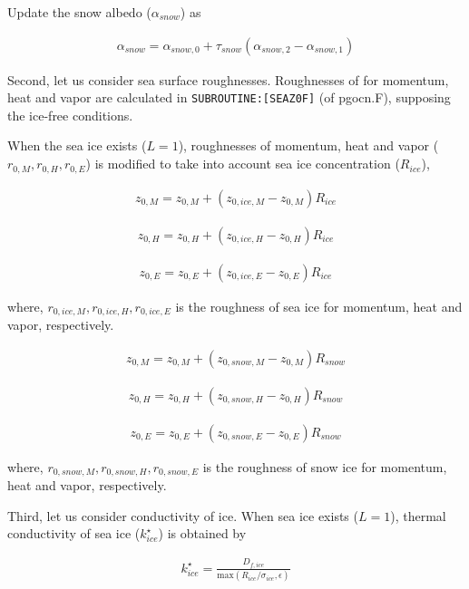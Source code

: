 Update the snow albedo (\(\alpha_{snow}\)) as

\begin{eqnarray}
    \alpha_{snow} = \alpha_{snow,0} + \tau_{snow}(\alpha_{snow,2}-\alpha_{snow,1})
\end{eqnarray}

Second, let us consider sea surface roughnesses. Roughnesses of for
momentum, heat and vapor are calculated in
\texttt{SUBROUTINE:{[}SEAZ0F{]}} (of pgocn.F), supposing the ice-free
conditions.

When the sea ice exists (\(L=1\)), roughnesses of momentum, heat and
vapor (\(r_{0,M},r_{0,H},r_{0,E}\)) is modified to take into account sea
ice concentration (\(R_{ice}\)),

\begin{eqnarray}
    z_{0,M} = z_{0,M} + ( z_{0,ice,M} - z_{0,M})  R_{ice}
\end{eqnarray}

\begin{eqnarray}
    z_{0,H} = z_{0,H} + ( z_{0,ice,H} - z_{0,H})  R_{ice}
\end{eqnarray}

\begin{eqnarray}
    z_{0,E} = z_{0,E} + ( z_{0,ice,E} - z_{0,E})  R_{ice}
\end{eqnarray}

where, \(r_{0,ice,M},r_{0,ice,H},r_{0,ice,E}\) is the roughness of sea
ice for momentum, heat and vapor, respectively.

\begin{eqnarray}
    z_{0,M} = z_{0,M} + ( z_{0,snow,M} - z_{0,M})  R_{snow}
\end{eqnarray}

\begin{eqnarray}
    z_{0,H} = z_{0,H} + ( z_{0,snow,H} - z_{0,H})  R_{snow}
\end{eqnarray}

\begin{eqnarray}
    z_{0,E} = z_{0,E} + ( z_{0,snow,E} - z_{0,E})  R_{snow}
\end{eqnarray}

where, \(r_{0,snow,M},r_{0,snow,H},r_{0,snow,E}\) is the roughness of
snow ice for momentum, heat and vapor, respectively.

Third, let us consider conductivity of ice. When sea ice exists
(\(L=1\)), thermal conductivity of sea ice (\(k_{ice}^\star\)) is
obtained by

\begin{eqnarray}
k_{ice}^\star = \frac{D_{f,ice}}{\mathrm{max}(R_{ice}/\sigma_{ice}, \epsilon)}
\end{eqnarray}

